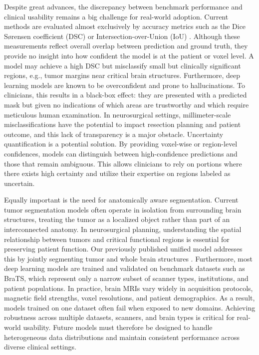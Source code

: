 \documentclass[11pt,letterpaper]{article}
\begin{document}
Despite great advances, the discrepancy between benchmark performance and clinical usability remains a big challenge for real-world adoption. Current methods are evaluated almost exclusively by accuracy metrics such as the Dice Sørensen coefficient (DSC) or Intersection-over-Union (IoU) \cite{zhou2024metastasis}. Although these measurements reflect overall overlap between prediction and ground truth, they provide no insight into how confident the model is at the patient or voxel level. A model may achieve a high DSC but misclassify small but clinically significant regions, e.g., tumor margins near critical brain structures. Furthermore, deep learning models are known to be overconfident and prone to hallucinations. To clinicians, this results in a black-box effect: they are presented with a predicted mask but given no indications of which areas are trustworthy and which require meticulous human examination. In neurosurgical settings, millimeter-scale misclassifications have the potential to impact resection planning and patient outcome, and this lack of transparency is a major obstacle. Uncertainty quantification is a potential solution. By providing voxel-wise or region-level confidences, models can distinguish between high-confidence predictions and those that remain ambiguous. This allows clinicians to rely on portions where there exists high certainty and utilize their expertise on regions labeled as uncertain.

Equally important is the need for anatomically aware segmentation. Current tumor segmentation models often operate in isolation from surrounding brain structures, treating the tumor as a localized object rather than part of an interconnected anatomy. In neurosurgical planning, understanding the spatial relationship between tumors and critical functional regions is essential for preserving patient function. Our previously published unified model addresses this by jointly segmenting tumor and whole brain structures \cite{zhou2025unified}. Furthermore, most deep learning models are trained and validated on benchmark datasets such as BraTS, which represent only a narrow subset of scanner types, institutions, and patient populations. In practice, brain MRIs vary widely in acquisition protocols, magnetic field strengths, voxel resolutions, and patient demographics. As a result, models trained on one dataset often fail when exposed to new domains. Achieving robustness across multiple datasets, scanners, and brain types is critical for real-world usability. Future models must therefore be designed to handle heterogeneous data distributions and maintain consistent performance across diverse clinical settings.
\end{document}
